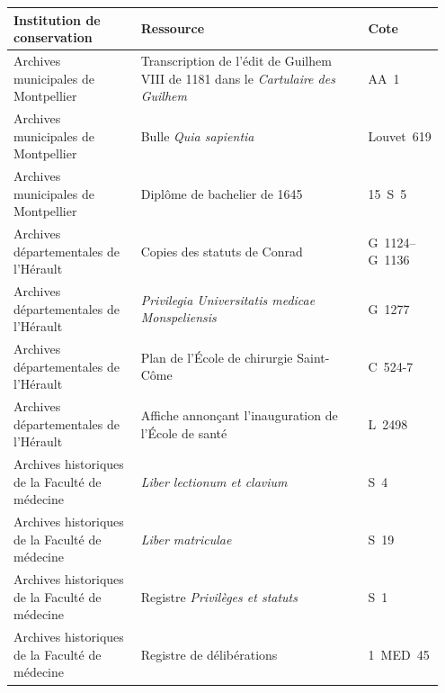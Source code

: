 \begin{landscape}
	\begin{table}[p]
		\centering
		\small
		\renewcommand{\arraystretch}{1.25}
		
		\begin{tabular}{
				@{}
				p{0.30\linewidth}
				p{0.55\linewidth}
				p{0.10\linewidth}
				@{}
			}
			\toprule
			\textbf{Institution de conservation}
			& \textbf{Ressource}
			& \textbf{Cote} \\
			\midrule
			
			Archives municipales de Montpellier
			& Transcription de l'édit de Guilhem VIII de 1181 dans le \emph{Cartulaire des Guilhem}
			& AA~1 \\
			
			Archives municipales de Montpellier
			& Bulle \emph{Quia sapientia}
			& Louvet~619 \\
			
			Archives municipales de Montpellier
			& Diplôme de bachelier de 1645
			& 15~S~5 \\
			
			\addlinespace[0.3em]
			
			Archives départementales de l'Hérault
			& Copies des statuts de Conrad
			& G~1124--G~1136 \\
			
			Archives départementales de l'Hérault
			& \emph{Privilegia Universitatis medicae Monspeliensis}
			& G~1277 \\
			
			Archives départementales de l'Hérault
			& Plan de l'École de chirurgie Saint-Côme
			& C~524-7 \\
			
			Archives départementales de l'Hérault
			& Affiche annonçant l'inauguration de l'École de santé
			& L~2498 \\
			
			\addlinespace[0.3em]
			
			Archives historiques de la Faculté de médecine
			& \emph{Liber lectionum et clavium}
			& S~4 \\
			
			Archives historiques de la Faculté de médecine
			& \emph{Liber matriculae}
			& S~19 \\
			
			Archives historiques de la Faculté de médecine
			& Registre \emph{Privilèges et statuts}
			& S~1 \\
			
			Archives historiques de la Faculté de médecine
			& Registre de délibérations
			& 1~MED~45 \\
			

\end{tabular}
\end{table}
\end{landscape}
